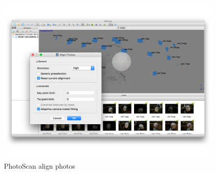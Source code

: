 \documentclass[12pt,a4paper]{scrartcl}
\begin{document}
\begin{figure}[!h]
  \includegraphics[width=1\textwidth]{PhotoScan-align}
  \caption{PhotoScan align photos}
  \label{fig:photoscanalign}
\end{figure}
\end{document}

